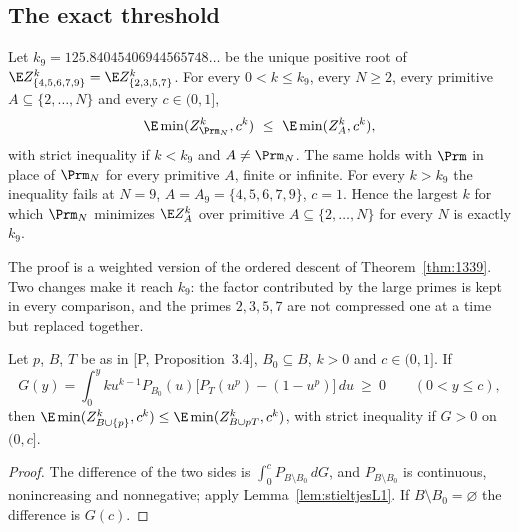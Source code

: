 \subsection{The exact threshold}

\begin{theorem}\label{thm:k9}
Let $k_9=125.84045406944565748\ldots$ be the unique positive root of
$\E Z_{\{4,5,6,7,9\}}^k=\E Z_{\{2,3,5,7\}}^k$. For every $0<k\le k_9$, every $N\ge2$, every primitive
$A\subseteq\{2,\dots,N\}$ and every $c\in(0,1]$,
\[
\E\min(Z_{\Prm_N}^k,c^k)\ \le\ \E\min(Z_A^k,c^k),
\]
with strict inequality if $k<k_9$ and $A\ne\Prm_N$. The same holds with $\Prm$ in place of
$\Prm_N$ for every primitive $A$, finite or infinite. For every $k>k_9$ the inequality fails at
$N=9$, $A=A_9=\{4,5,6,7,9\}$, $c=1$. Hence the largest $k$ for which $\Prm_N$ minimizes $\E Z_A^k$
over primitive $A\subseteq\{2,\dots,N\}$ for every $N$ is exactly $k_9$.
\end{theorem}

The proof is a weighted version of the ordered descent of Theorem~\ref{thm:1339}. Two changes
make it reach $k_9$: the factor contributed by the large primes is kept in every comparison,
and the primes $2,3,5,7$ are not compressed one at a time but replaced together.

\begin{lemma}\label{lem:wexch}
Let $p$, $B$, $T$ be as in [P, Proposition~3.4], $B_0\subseteq B$, $k>0$ and $c\in(0,1]$. If
\[
G(y)=\int_0^yku^{k-1}P_{B_0}(u)\bigl[P_T(u^p)-(1-u^p)\bigr]\,du\ \ge\ 0\qquad(0<y\le c),
\]
then $\E\min(Z_{B\cup\{p\}}^k,c^k)\le\E\min(Z_{B\cup pT}^k,c^k)$, with strict inequality if $G>0$
on $(0,c]$.
\end{lemma}

\begin{proof}
The difference of the two sides is $\int_0^cP_{B\setminus B_0}\,dG$, and $P_{B\setminus B_0}$ is
continuous, nonincreasing and nonnegative; apply Lemma~\ref{lem:stieltjesL1}. If
$B\setminus B_0=\varnothing$ the difference is $G(c)$.
\end{proof}

